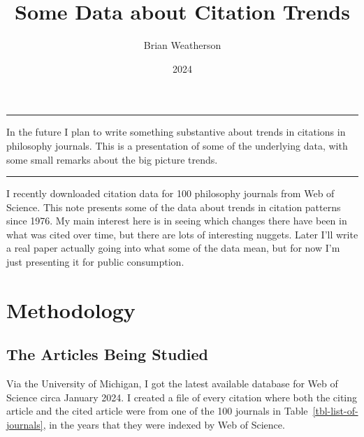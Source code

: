 \documentclass[
  10pt,
  letterpaper,
  DIV=11,
  numbers=noendperiod,
  twoside]{scrartcl}
\title{Some Data about Citation Trends}
\author{Brian Weatherson}
\date{2024}
\renewenvironment{abstract}
 {\vspace{-1.25cm}
 \quotation\small\noindent\rule{\linewidth}{.5pt}\par\smallskip
 \noindent }
 {\par\noindent\rule{\linewidth}{.5pt}\endquotation}
\begin{document}
\maketitle
\begin{abstract}
In the future I plan to write something substantive about trends in
citations in philosophy journals. This is a presentation of some of the
underlying data, with some small remarks about the big picture trends.
\end{abstract}

I recently downloaded citation data for 100 philosophy journals from Web
of Science. This note presents some of the data about trends in citation
patterns since 1976. My main interest here is in seeing which changes
there have been in what was cited over time, but there are lots of
interesting nuggets. Later I'll write a real paper actually going into
what some of the data mean, but for now I'm just presenting it for
public consumption.

\section{Methodology}\label{sec-methodology}

\subsection{The Articles Being Studied}\label{sec-articles-studied}

Via the University of Michigan, I got the latest available database for
Web of Science circa January 2024. I created a file of every citation
where both the citing article and the cited article were from one of the
100 journals in Table~\ref{tbl-list-of-journals}, in the years that they
were indexed by Web of Science.
\end{document}
